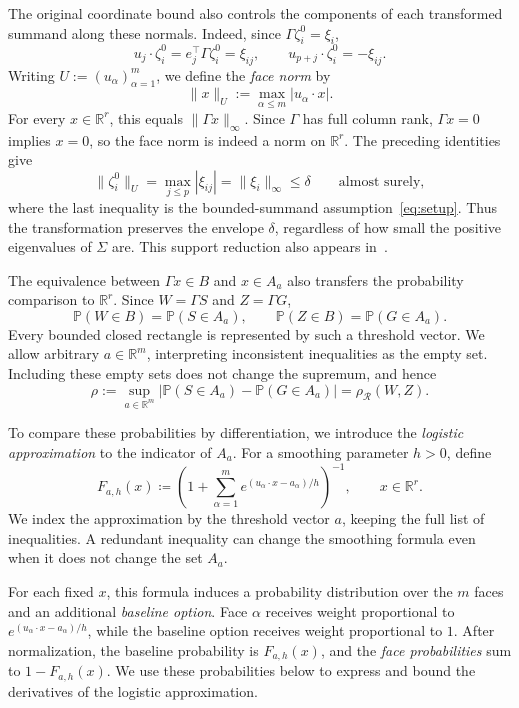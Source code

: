\documentclass[11pt,letterpaper]{article}
\newenvironment{recovered}{\color{magenta}}{}
\theoremstyle{remark}
\newcommand{\Pp}{\mathbb P}
\newcommand{\R}{\mathbb R}
\newcommand{\rh}{\rho_{\mathcal R}}
\begin{document}
The original coordinate bound also controls the components of each
transformed summand along these normals. Indeed, since
\(\Gamma\zeta_i^0=\xi_i\),
\[
 u_j\cdot\zeta_i^0=e_j^\top\Gamma\zeta_i^0=\xi_{ij},
 \qquad u_{p+j}\cdot\zeta_i^0=-\xi_{ij}.
\]
Writing \(U:=(u_\alpha)_{\alpha=1}^m\), we define the \emph{face norm} by
\[
 \|x\|_U:=\max_{\alpha\le m}|u_\alpha\cdot x|.
\]
\begin{recovered}
For every \(x\in\R^r\), this equals \(\|\Gamma x\|_\infty\).
Since \(\Gamma\) has full column rank, \(\Gamma x=0\) implies \(x=0\),
so the face norm is indeed a norm on \(\R^r\).
\end{recovered}
The preceding identities give
\[
 \|\zeta_i^0\|_U=\max_{j\le p}|\xi_{ij}|
 =\|\xi_i\|_\infty\le\delta\qquad\text{almost surely},
\]
where the last inequality is the bounded-summand assumption~\eqref{eq:setup}.
Thus the transformation preserves the envelope \(\delta\), regardless
of how small the positive eigenvalues of \(\Sigma\) are. This support reduction also appears in~\cite[Section~2.3]{GaoZhang}.

\begin{recovered}
The equivalence between \(\Gamma x\in B\) and \(x\in A_a\) also
transfers the probability comparison to \(\R^r\). Since
\(W=\Gamma S\) and \(Z=\Gamma G\),
\[
 \Pp(W\in B)=\Pp(S\in A_a),\qquad
 \Pp(Z\in B)=\Pp(G\in A_a).
\]
Every bounded closed rectangle is represented by such a threshold
vector. We allow arbitrary \(a\in\R^m\), interpreting inconsistent
inequalities as the empty set. Including these empty sets does not
change the supremum, and hence
\[
 \rho:=\sup_{a\in\R^m}
 |\Pp(S\in A_a)-\Pp(G\in A_a)|=\rh(W,Z).
\]
\end{recovered}

To compare these probabilities by differentiation, we introduce the
\emph{logistic approximation} to the indicator of \(A_a\). For a smoothing
parameter \(h>0\), define
\begin{equation}
 F_{a,h}(x)\coloneqq
 \left(1+\sum_{\alpha=1}^m
 e^{(u_\alpha\cdot x-a_\alpha)/h}\right)^{-1},
 \qquad x\in\R^r.
 \label{eq:selector}
\end{equation}
\begin{recovered}
We index the approximation by the threshold vector \(a\), keeping the
full list of inequalities. A redundant inequality can change the
smoothing formula even when it does not change the set \(A_a\).
\end{recovered}

For each fixed \(x\), this formula induces a probability distribution
over the \(m\) faces and an additional \emph{baseline option}. Face
\(\alpha\) receives weight proportional to
\(e^{(u_\alpha\cdot x-a_\alpha)/h}\), while the baseline option receives
weight proportional to \(1\). After normalization, the baseline
probability is \(F_{a,h}(x)\), and the \emph{face probabilities} sum to
\(1-F_{a,h}(x)\). We use these probabilities below to express and bound
the derivatives of the logistic approximation.
\end{document}
